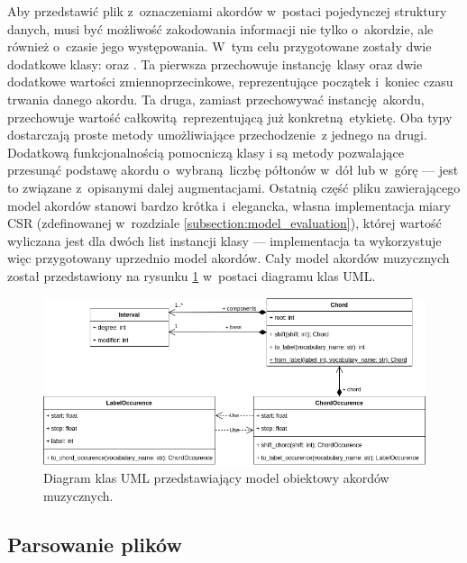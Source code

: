 Aby przedstawić plik z~oznaczeniami akordów w~postaci pojedynczej struktury danych, musi być możliwość zakodowania informacji nie tylko o~akordzie, ale również o~czasie jego występowania. W~tym celu przygotowane zostały dwie dodatkowe klasy:  oraz . Ta pierwsza przechowuje instancję klasy  oraz dwie dodatkowe wartości zmiennoprzecinkowe, reprezentujące początek i~koniec czasu trwania danego akordu. Ta druga, zamiast przechowywać instancję akordu, przechowuje wartość całkowitą reprezentującą już konkretną etykietę. Oba typy dostarczają proste metody umożliwiające przechodzenie z jednego na drugi. Dodatkową funkcjonalnością pomocniczą klasy  i  są metody pozwalające przesunąć podstawę akordu o~wybraną liczbę półtonów w~dół lub w~górę --- jest to związane z~opisanymi dalej augmentacjami. Ostatnią część pliku zawierającego model akordów stanowi bardzo krótka i~elegancka, własna implementacja miary CSR (zdefinowanej w~rozdziale \ref{subsection:model_evaluation}), której wartość wyliczana jest dla dwóch list instancji klasy  --- implementacja ta wykorzystuje więc przygotowany uprzednio model akordów.  Cały model akordów muzycznych został przedstawiony na rysunku \ref{fig:chord_model} w~postaci diagramu klas UML.

\begin{figure}
    \centering
    \includegraphics[width=1.0\textwidth]{./images/chord_model.png}
    \caption{Diagram klas UML przedstawiający model obiektowy akordów muzycznych.}
    \label{fig:chord_model}
\end{figure}

\subsection{Parsowanie plików }

